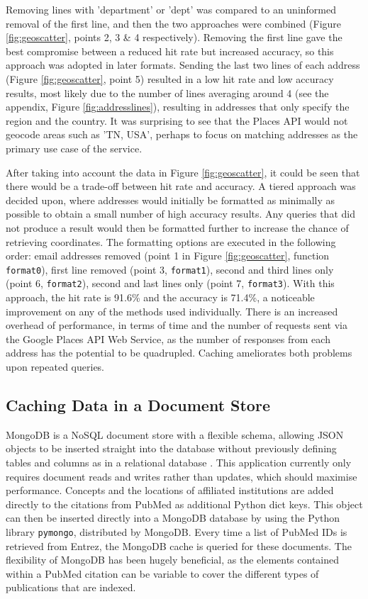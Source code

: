 \documentclass[Report.tex]{subfiles}
\begin{document}
\noindent Removing lines with 'department' or 'dept' was compared to an uninformed removal of the first line, and then the two approaches were combined (Figure \ref{fig:geoscatter}, points 2, 3 \& 4 respectively). Removing the first line gave the best compromise between a reduced hit rate but increased accuracy, so this approach was adopted in later formats. Sending the last two lines of each address (Figure \ref{fig:geoscatter}, point 5) resulted in a low hit rate and low accuracy results, most likely due to the number of lines averaging around 4 (see the appendix, Figure \ref{fig:addresslines}), resulting in addresses that only specify the region and the country. It was surprising to see that the Places API would not geocode areas such as 'TN, USA', perhaps to focus on matching addresses as the primary use case of the service.\newline

\noindent After taking into account the data in Figure \ref{fig:geoscatter}, it could be seen that there would be a trade-off between hit rate and accuracy. A tiered approach was decided upon, where addresses would initially be formatted as minimally as possible to obtain a small number of high accuracy results. Any queries that did not produce a result would then be formatted further to increase the chance of retrieving coordinates. The formatting options are executed in the following order: email addresses removed (point 1 in Figure \ref{fig:geoscatter}, function \texttt{format0}), first line removed (point 3, \texttt{format1}), second and third lines only (point 6, \texttt{format2}), second and last lines only (point 7, \texttt{format3}). With this approach, the hit rate is 91.6\% and the accuracy is 71.4\%, a noticeable improvement on any of the methods used individually. There is an increased overhead of performance, in terms of time and the number of requests sent via the Google Places API Web Service, as the number of responses from each address has the potential to be quadrupled. Caching ameliorates both problems upon repeated queries.

\subsection{Caching Data in a Document Store}
MongoDB is a NoSQL document store with a flexible schema, allowing JSON objects to be inserted straight into the database without previously defining tables and columns as in a relational database \cite{mongo}. This application currently only requires document reads and writes rather than updates, which should maximise performance. Concepts and the locations of affiliated institutions are added directly to the citations from PubMed as additional Python dict keys. This object can then be inserted directly into a MongoDB database by using the Python library \texttt{pymongo}, distributed by MongoDB. Every time a list of PubMed IDs is retrieved from Entrez, the MongoDB cache is queried for these documents. The flexibility of MongoDB has been hugely beneficial, as the elements contained within a PubMed citation can be variable to cover the different types of publications that are indexed.\newline
\end{document}

